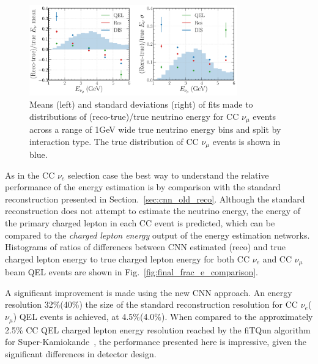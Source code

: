 \begin{figure} %
    \includegraphics[width=0.8\textwidth]{diagrams/7-results/final_energy_numu.pdf}
    \caption[Means and standard deviations of fits to $\nu_{\mu}$ energy distributions]
    {Means (left) and standard deviations (right) of fits made to distributions of
        (reco-true)/true neutrino energy for CC $\nu_{\mu}$ events across a range of \unit{1}{GeV}
        wide true neutrino energy bins and split by interaction type. The true distribution of CC
        $\nu_{\mu}$ events is shown in blue.}
    \label{fig:final_energy_numu}
\end{figure}

As in the CC $\nu_{e}$ selection case the best way to understand the relative performance of the
energy estimation is by comparison with the standard reconstruction presented in
Section.~\ref{sec:cnn_old_reco}. Although the standard reconstruction does not attempt to estimate
the neutrino energy, the energy of the primary charged lepton in each CC event is predicted, which
can be compared to the \emph{charged lepton energy} output of the energy estimation networks.
Histograms of ratios of differences between CNN estimated (reco) and true charged lepton energy to
true charged lepton energy for both CC $\nu_{e}$ and CC $\nu_{\mu}$ beam QEL events are shown in
Fig.~\ref{fig:final_frac_e_comparison}.

A significant improvement is made using the new CNN approach. An energy resolution 32\%(40\%) the
size of the standard reconstruction resolution for CC $\nu_{e}$($\nu_{\mu}$) QEL events is
achieved, at 4.5\%(4.0\%). When compared to the approximately 2.5\% CC QEL charged lepton energy
resolution reached by the fiTQun algorithm for Super-Kamiokande~\cite{jiang2019}, the performance
presented here is impressive, given the significant differences in detector design.

